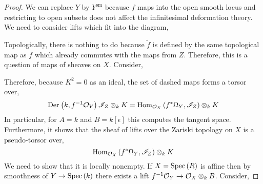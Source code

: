 \documentclass[12pt]{article}
\begin{document}
\begin{proof}
We can replace $Y$ by $Y^{\text{sm}}$ because $f$ maps into the open smooth locus and restricting to open subsets does not affect the infinitesimal deformation theory. We need to consider lifts which fit into the diagram,
\begin{center}
\end{center}
Topologically, there is nothing to do because $\tilde{f}$ is defined by the same topological map as $f$ which already commutes with the maps from $Z$. Therefore, this is a question of maps of sheaves on $X$. Consider, 
\begin{center}
\end{center}
Therefore, because $K^2 = 0$ as an ideal, the set of dashed maps forms a torsor over,
\[ \mathrm{Der}_{} \left( k, f^{-1} \mathcal{O}_{Y} \right){\mathscr{I}_Z \otimes_k K} = \mathrm{Hom}_{\mathcal{O}_{X}} \left( f^* \Omega_Y, \mathscr{I}_Z \right) \otimes_k K \]
In particular, for $A = k$ and $B = k[\epsilon]$ this computes the tangent space. Furthermore, it shows that the sheaf of lifts over the Zariski topology on $X$ is a pseudo-torsor over,
\[  \mathrm{Hom}_{\mathcal{O}_{X}} \left( f^* \Omega_Y, \mathscr{I}_Z \right) \otimes_k K \]
We need to show that it is locally nonempty. If $X = \mathrm{Spec}\left( R \right)$ is affine then by smoothness of $Y \to \mathrm{Spec}\left( k \right)$ there exists a lift $f^{-1} \mathcal{O}_{Y} \to \mathcal{O}_{X} \otimes_k B$. Consider,


\end{proof}
\end{document}
